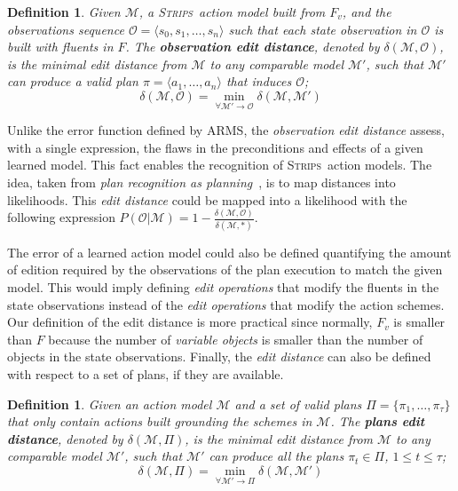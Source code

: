 \documentclass[3p,times]{elsarticle}
\newtheorem{mydefinition}[mytheorem]{Definition}
\newcommand{\strips}{\textsc{Strips}}     %
\newcommand{\tup}[1]{{\langle #1 \rangle}}
\begin{document}
\begin{mydefinition}
  Given $\mathcal{M}$, a \strips\ action model built from $F_v$, and the observations sequence $\mathcal{O}=\tup{s_0, s_1, \ldots, s_n}$ such that each state observation in $\mathcal{O}$ is built with fluents in $F$. The {\bf observation edit distance}, denoted by  $\delta(\mathcal{M},\mathcal{O})$, is the minimal edit distance from $\mathcal{M}$ to any {\em comparable} model $\mathcal{M}'$, such that $\mathcal{M}'$ can produce a valid plan $\pi=\tup{a_1, \ldots, a_n}$ that induces $\mathcal{O}$; \[\delta(\mathcal{M},\mathcal{O})=\min_{\forall \mathcal{M}' \rightarrow \mathcal{O}} \delta(\mathcal{M},\mathcal{M}')\]
\end{mydefinition}

Unlike the error function defined by {\sc ARMS}, the {\em observation edit distance} assess, with a single expression, the flaws in the preconditions and effects of a given learned model. This fact enables the recognition of \strips\ action models. The idea, taken from {\em plan recognition as planning}~\cite{ramirez2009plan}, is to map distances into likelihoods. This {\em edit distance} could be mapped into a likelihood with the following expression $P(\mathcal{O}|\mathcal{M})=1-\frac{\delta(\mathcal{M},\mathcal{O})}{\delta(\mathcal{M},*)}$.

The error of a learned action model could also be defined quantifying the amount of edition required by the observations of the plan execution to match the given model. This would imply defining {\em edit operations} that modify the fluents in the state observations instead of the {\em edit operations} that modify the action schemes. Our definition of the edit distance is more practical since normally, $F_v$ is smaller than $F$ because the number of {\em variable objects} is smaller than the number of objects in the state observations. Finally, the {\em edit distance} can also be defined with respect to a set of plans, if they are available. 

\begin{mydefinition}
  Given an action model $\mathcal{M}$ and a set of valid plans $\Pi=\{\pi_1,\ldots,\pi_{\tau}\}$ that only contain actions built grounding the schemes in $\mathcal{M}$. The {\bf plans edit distance}, denoted by  $\delta(\mathcal{M},\Pi)$, is the minimal edit distance from $\mathcal{M}$ to any {\em comparable} model $\mathcal{M}'$, such that $\mathcal{M}'$ can produce all the plans $\pi_t\in \Pi$, {\tt\small $1\leq t\leq \tau$}; \[\delta(\mathcal{M},\Pi)=\min_{\forall \mathcal{M}' \rightarrow \Pi} \delta(\mathcal{M},\mathcal{M}')\]
\end{mydefinition}
\end{document}
